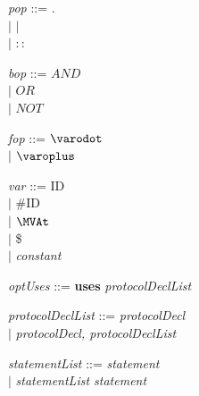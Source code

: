 \textit{pop} ::= $.$ \\
\hspace*{5.3em} $ | $ \hspace{0.4em} $|$\\
\hspace*{5.3em} $ | $ \hspace{0.4em} $::$\smallskip

\textit{bop} ::= \hspace{3.1em} $AND$ \\
\hspace*{5.3em} $ | $ \hspace{0.4em} $OR$\\
\hspace*{5.3em} $ | $ \hspace{0.4em} $NOT$\smallskip

\textit{fop} ::= \hspace{3.1em} $\varodot$ \\
\hspace*{5.3em} $ | $ \hspace{0.4em} $\varoplus$\smallskip

\textit{var} ::= \hspace{3.1em} ID \\
\hspace*{5.3em} $ | $ \hspace{0.4em} \#ID\\
\hspace*{5.3em} $ | $ \hspace{0.4em} $\MVAt$\\
\hspace*{5.3em} $ | $ \hspace{0.4em} \$\\
\hspace*{5.3em} $ | $ \hspace{0.4em} \textit{constant}\smallskip

\textit{optUses} ::= \textbf{uses} \textit{protocolDeclList}\smallskip

\textit{protocolDeclList} ::= \textit{protocolDecl} \\
\hspace*{5.3em} $ | $ \hspace{0.4em} \textit{protocolDecl, protocolDeclList}\smallskip

\textit{statementList} ::= \textit{statement}\\
\hspace*{5.3em} $ | $ \hspace{0.4em} \textit{statementList statement}\smallskip

